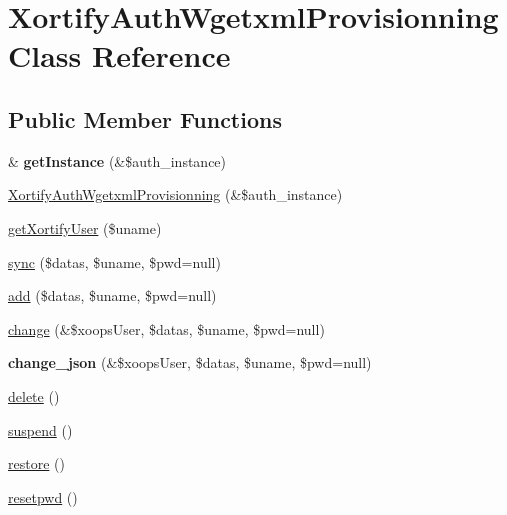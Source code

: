 \hypertarget{class_xortify_auth_wgetxml_provisionning}{\section{Xortify\-Auth\-Wgetxml\-Provisionning Class Reference}
\label{class_xortify_auth_wgetxml_provisionning}
}
\subsection*{Public Member Functions}
\begin{DoxyCompactItemize}
\item 
\hypertarget{class_xortify_auth_wgetxml_provisionning_abfcdf76ec266fd952a10eb539acb531b}{\& {\bfseries get\-Instance} (\&\$auth\-\_\-instance)}\label{class_xortify_auth_wgetxml_provisionning_abfcdf76ec266fd952a10eb539acb531b}

\item 
\hyperlink{class_xortify_auth_wgetxml_provisionning_ad6ad5053c28e80c2907facb719d5cb3f}{Xortify\-Auth\-Wgetxml\-Provisionning} (\&\$auth\-\_\-instance)
\item 
\hyperlink{class_xortify_auth_wgetxml_provisionning_a4fdf84660e255fcab2d05134e6fffdca}{get\-Xortify\-User} (\$uname)
\item 
\hyperlink{class_xortify_auth_wgetxml_provisionning_aa4f627c7598bbe99c2be94dff60073fa}{sync} (\$datas, \$uname, \$pwd=null)
\item 
\hyperlink{class_xortify_auth_wgetxml_provisionning_a16384f328ec42df1a2251b5afca8d72f}{add} (\$datas, \$uname, \$pwd=null)
\item 
\hyperlink{class_xortify_auth_wgetxml_provisionning_a71274fc25b0540e25e9a3f20c2fa5ac0}{change} (\&\$xoops\-User, \$datas, \$uname, \$pwd=null)
\item 
\hypertarget{class_xortify_auth_wgetxml_provisionning_a25ca2870233d295fe58b7543553303d5}{{\bfseries change\-\_\-json} (\&\$xoops\-User, \$datas, \$uname, \$pwd=null)}\label{class_xortify_auth_wgetxml_provisionning_a25ca2870233d295fe58b7543553303d5}

\item 
\hyperlink{class_xortify_auth_wgetxml_provisionning_a47b6651db7eb90a8e109af792eeca36f}{delete} ()
\item 
\hyperlink{class_xortify_auth_wgetxml_provisionning_a5110cbf9a466764ee6ba00aa0195c7a2}{suspend} ()
\item 
\hyperlink{class_xortify_auth_wgetxml_provisionning_abf464681c0e3562491afa93e6c5f35ea}{restore} ()
\item 
\hyperlink{class_xortify_auth_wgetxml_provisionning_a9c2098addc53a56ebca9288bcee39828}{resetpwd} ()
\end{DoxyCompactItemize}
